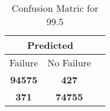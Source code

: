 \begin{table}[] 
\label{Table: Prediction Accuracy-DMD99.5OnlySunEKF-combinationReflection-Reflection} 
\caption{Confusion Matric for 99.5} 
\centering 
\begin{tabular} 
 {@{}ccc@{}} 
\toprule 
\multicolumn{2}{c}{\textbf{Predicted}}
 \\ \midrule 
\multicolumn{1}{|c|}{Failure} & 
\multicolumn{1}{c|}{No Failure}
 \\ \midrule 
\multicolumn{1}{|c|}{\color{green}\textbf{94575}} & 
\multicolumn{1}{c|}{\color{red}\textbf{427}}
 \\ \midrule 
\multicolumn{1}{|c|}{\color{red}\textbf{371}} & 
\multicolumn{1}{c|}{\color{green}\textbf{74755}}
 \\ \bottomrule 
\end{tabular} 
\end{table} 
